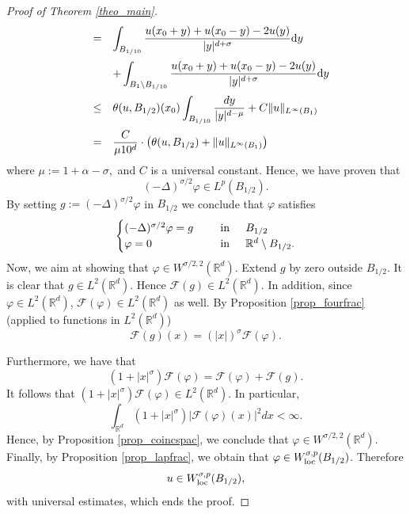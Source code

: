 \documentclass[10pt]{article} %
\begin{document}
\begin{proof}[Proof of Theorem \ref{theo_main}]
\[\begin{array}{lcl}
 & = & \displaystyle \int_{B_{1/10}}\frac{u(x_0+y) + u(x_0-y) - 2u(y)}{|y|^{d+\sigma}} {\rm d}y \vspace{0.2cm} \\
 &   & + \displaystyle \int_{B_1\setminus B_{1/10}}\frac{u(x_0+y) + u(x_0-y) - 2u(y)}{|y|^{d+\sigma}} {\rm d}y \vspace{0.2cm} \\
 & \leq & \displaystyle \theta(u, B_{1/2})(x_0)\int_{B_{1/10}}\frac{dy}{|y|^{d-\mu}} + C\|u\|_{L^{\infty}(B_{1})} \vspace{0.2cm} \\
 & = & \displaystyle \frac{C}{\mu 10^d}\cdot \left ( \theta(u,B_{1/2}) + \|u\|_{L^{\infty}(B_{1})} \right )
\end{array}
\]
where $\mu := 1 + \alpha - \sigma,$ and $C$ is a universal constant. Hence, we have proven that
\[
	(-\Delta)^{\sigma/2}\varphi \in L^{p}(B_{1/2}).
\]
By setting $g:= (-\Delta)^{\sigma/2}\varphi$ in $B_{1/2}$ we conclude that $\varphi$ satisfies
\[
	\begin{cases}
		(-\Delta)^{\sigma/2}\varphi = g&\hspace{.2in} \mbox{in}\hspace{.2in}   B_{1/2} \\
		\varphi = 0 &\hspace{.2in} \mbox{in}\hspace{.2in}     \mathbb{R}^d\setminus B_{1/2} .
	\end{cases}
\]
Now, we aim at showing that $\varphi \in W^{\sigma/2, 2}(\mathbb{R}^d)$. Extend $g$ by zero outside $B_{1/2}$. It is clear that $g \in L^2(\mathbb{R}^d)$. Hence ${\mathcal F}(g) \in L^2(\mathbb{R}^d)$. In addition, since $\varphi \in L^2(\mathbb{R}^d)$, ${\mathcal F}(\varphi) \in L^2({\mathbb{R}^d})$ as well. By Proposition \ref{prop_fourfrac} (applied to functions in $L^2(\mathbb{R}^d)$)
\[
{\mathcal F}(g)(x) = (|x|)^{\sigma}{\mathcal F}(\varphi).
\]

Furthermore, we have that
\[
(1 + |x|^{\sigma}){\mathcal F}(\varphi) = {\mathcal F}(\varphi) + {\mathcal F}(g).
\]
It follows that $(1 + |x|^\sigma){\mathcal F}(\varphi) \in L^{2}(\mathbb{R}^d)$. In particular, 
\[
\int_{\mathbb{R}^d}(1 + |x|^{\sigma})|{\mathcal F}(\varphi)(x)|^2dx < \infty.
\]
Hence, by Proposition \ref{prop_coincspac}, we conclude that $\varphi \in W^{\sigma/2, 2}(\mathbb{R}^d)$. Finally, by Proposition \ref{prop_lapfrac}, we obtain that $\varphi \in W^{\sigma,p}_{\rm loc}(B_{1/2})$. Therefore
\[
u \in W^{\sigma,p}_{\rm loc}(B_{1/2}),
\]
with universal estimates, which ends the proof.
\end{proof}
\end{document}
